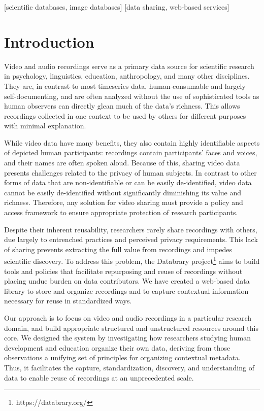 \documentclass{sig-alternate-2013}
\begin{document}
[scientific databases, image databases]
[data sharing, web-based services]



\break
\section{Introduction}

Video and audio recordings serve as a primary data source for scientific research in psychology, linguistics, education, anthropology, and many other disciplines.
They are, in contrast to most timeseries data, human-consumable and largely self-documenting, and are often analyzed without the use of sophisticated tools as human observers can directly glean much of the data's richness.
This allows recordings collected in one context to be used by others for different purposes with minimal explanation.

While video data have many benefits, they also contain highly identifiable aspects of depicted human participants: recordings contain participants' faces and voices, and their names are often spoken aloud.
Because of this, sharing video data presents challenges related to the privacy of human subjects.
In contrast to other forms of data that are non-identifiable or can be easily de-identified, video data cannot be easily de-identified without significantly diminishing its value and richness. 
Therefore, any solution for video sharing must provide a policy and access framework to ensure appropriate protection of research participants.

Despite their inherent reusability, researchers rarely share recordings with others, due largely to entrenched practices and perceived privacy requirements.
This lack of sharing prevents extracting the full value from recordings and impedes scientific discovery.
To address this problem, the Databrary project\footnote{https://databrary.org/} aims to build tools and policies that facilitate repurposing and reuse of recordings without placing undue burden on data contributors.
We have created a web-based data library to store and organize recordings and to capture contextual information necessary for reuse in standardized ways.

Our approach is to focus on video and audio recordings in a particular research domain, and build appropriate structured and unstructured resources around this core.
We designed the system by investigating how researchers studying human development and education organize their own data, deriving from those observations a unifying set of principles for organizing contextual metadata.
Thus, it facilitates the capture, standardization, discovery, and understanding of data to enable reuse of recordings at an unprecedented scale.
\end{document}
